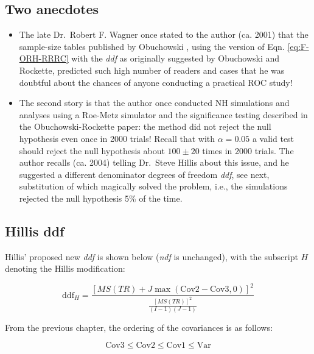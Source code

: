 \documentclass[
]{book}
\begin{document}
\hypertarget{TwoAnecdotes}{%
\subsection{Two anecdotes}\label{TwoAnecdotes}}

\begin{itemize}
\item
  The late Dr.~Robert F. Wagner once stated to the author (ca. 2001) that the sample-size tables published by Obuchowski \citep{RN1971, RN1972}, using the version of Eqn. \eqref{eq:F-ORH-RRRC} with the \emph{ddf} as originally suggested by Obuchowski and Rockette, predicted such high number of readers and cases that he was doubtful about the chances of anyone conducting a practical ROC study!
\item
  The second story is that the author once conducted NH simulations and analyses using a Roe-Metz simulator \citep{RN1125} and the significance testing described in the Obuchowski-Rockette paper: the method did not reject the null hypothesis even once in 2000 trials! Recall that with \(\alpha = 0.05\) a valid test should reject the null hypothesis about \(100\pm20\) times in 2000 trials. The author recalls (ca. 2004) telling Dr.~Steve Hillis about this issue, and he suggested a different denominator degrees of freedom \emph{ddf}, see next, substitution of which magically solved the problem, i.e., the simulations rejected the null hypothesis 5\% of the time.
\end{itemize}

\hypertarget{Hills-ddf}{%
\subsection{Hillis ddf}\label{Hills-ddf}}

Hillis' proposed new \emph{ddf} is shown below (\emph{ndf} is unchanged), with the subscript \(H\) denoting the Hillis modification:

\begin{equation}
\text{ddf}_H = \frac{\left [ MS(TR) + J \max(\text{Cov2}-\text{Cov3},0)\right ]^2}{\frac{\left [ MS(TR) \right ]^2}{(I-1)(J-1)}}
\label{eq:ddfH-RRRC}
\end{equation}

From the previous chapter, the ordering of the covariances is as follows:

\begin{equation*}
\text{Cov3} \leq  \text{Cov2} \leq  \text{Cov1} \leq  \text{Var}
\end{equation*}
\end{document}

